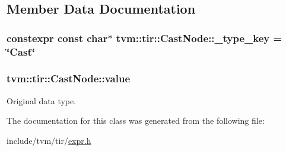 \subsection{Member Data Documentation}
\subsubsection[{\texorpdfstring{\+\_\+type\+\_\+key}{_type_key}}]{\setlength{\rightskip}{0pt plus 5cm}constexpr const char$\ast$ tvm\+::tir\+::\+Cast\+Node\+::\+\_\+type\+\_\+key = \char`\"{}Cast\char`\"{}\hspace{0.3cm}{\ttfamily [static]}}\hypertarget{classtvm_1_1tir_1_1CastNode_ad9b8ef8c5a3bb223c4d19503007af162}{}\label{classtvm_1_1tir_1_1CastNode_ad9b8ef8c5a3bb223c4d19503007af162}
\subsubsection[{\texorpdfstring{value}{value}}]{ tvm\+::tir\+::\+Cast\+Node\+::value}\hypertarget{classtvm_1_1tir_1_1CastNode_a6075e57a3e8dd0f751d7997cafb9bce0}{}\label{classtvm_1_1tir_1_1CastNode_a6075e57a3e8dd0f751d7997cafb9bce0}


Original data type. 



The documentation for this class was generated from the following file\+:\begin{DoxyCompactItemize}
\item 
include/tvm/tir/\hyperlink{tir_2expr_8h}{expr.\+h}\end{DoxyCompactItemize}
